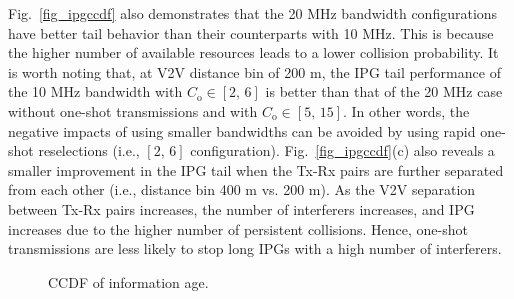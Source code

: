 \documentclass[conference]{IEEEtran}
\begin{document}
Fig.~\ref{fig_ipgccdf} also demonstrates that the 20 MHz bandwidth configurations have better tail behavior than their counterparts with 10 MHz. This is because the higher number of available resources leads to a lower collision probability. %
It is worth noting that, at V2V distance bin of 200 m, the IPG tail performance of the 10 MHz bandwidth with $C_{\mathrm{o}}\in[2,\,6]$ is better than that of the 20 MHz case without one-shot transmissions and with $C_{\mathrm{o}}\in[5,\,15]$. In other words, the negative impacts of using smaller bandwidths can be avoided by using rapid one-shot reselections (i.e., $[2,\,6]$ configuration). Fig.~\ref{fig_ipgccdf}(c) also reveals a smaller improvement in the IPG tail when the Tx-Rx pairs are further separated from each other (i.e., distance bin 400 m vs. 200 m). As the V2V separation between Tx-Rx pairs increases, the number of interferers increases, and IPG increases due to the higher number of persistent collisions. Hence, one-shot transmissions are less likely to stop long IPGs with a high number of interferers.
\begin{comment}
\begin{table}
\renewcommand{\arraystretch}{1.3}
  \centering
  \caption{Average relative gains in IPG CCDF.}\label{tab_ipgstats}
        \begin{tabular}{ P{1.8cm} P{.8cm} P{.8cm} P{.8cm} P{.8cm}}
        \hline
        \textbf{V2V distance}  & \textbf{515-20} & \textbf{26-20} & \textbf{515-10} & \textbf{26-10}\\ \hline
        200 & .94731 & .99638 & .93058 & .99298\\ \hline
        300 & .90240 & .98827 & .84946 & .97370\\ \hline
        400 & .82197 & .96504 & .73386 & .92858\\ \hline
        \end{tabular}
        \vspace{-.15in}
\end{table}
\end{comment}
\begin{figure*}
\caption{CCDF of information age.}
\label{fig_iaccdf}
\vspace{-.25in}
\end{figure*}
\end{document}
